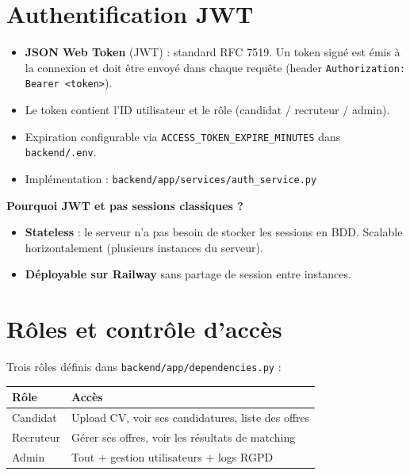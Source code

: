 \documentclass[12pt,a4paper]{report}
\newenvironment{whybox}[1][Pourquoi ce choix ?]{%
  \colorbox{yellow!20}{\textbf{\textcolor{navyblue}{#1}}}\vspace{2pt}
  \begin{framed}%
}{\end{framed}}
\newcommand{\filepath}[1]{\texttt{\small\textcolor{codeblue}{#1}}}
\begin{document}
\section{Authentification JWT}

\begin{itemize}
  \item \textbf{JSON Web Token} (JWT) : standard RFC 7519. Un token signé est
        émis à la connexion et doit être envoyé dans chaque requête
        (header \texttt{Authorization: Bearer <token>}).
  \item Le token contient l'ID utilisateur et le rôle (candidat / recruteur / admin).
  \item Expiration configurable via \texttt{ACCESS\_TOKEN\_EXPIRE\_MINUTES} dans
        \filepath{backend/.env}.
  \item Implémentation : \filepath{backend/app/services/auth\_service.py}
\end{itemize}

\begin{whybox}[Pourquoi JWT et pas sessions classiques ?]
\begin{itemize}
  \item \textbf{Stateless} : le serveur n'a pas besoin de stocker les sessions en BDD.
        Scalable horizontalement (plusieurs instances du serveur).
  \item \textbf{Déployable sur Railway} sans partage de session entre instances.
\end{itemize}
\end{whybox}

\section{Rôles et contrôle d'accès}

Trois rôles définis dans \filepath{backend/app/dependencies.py} :

\begin{center}
\begin{tabular}{ll}
\toprule
\textbf{Rôle} & \textbf{Accès} \\
\midrule
Candidat & Upload CV, voir ses candidatures, liste des offres \\
Recruteur & Gérer ses offres, voir les résultats de matching \\
Admin & Tout + gestion utilisateurs + logs RGPD \\
\bottomrule
\end{tabular}
\end{center}
\end{document}
